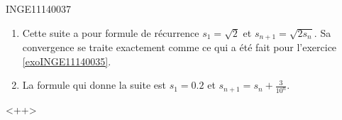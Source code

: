 

\begin{corrige}{INGE11140037}

	\begin{enumerate}

		\item
			Cette suite a pour formule de récurrence $s_1=\sqrt{2}$ et $s_{n+1}=\sqrt{2s_{n}}$. Sa convergence se traite exactement comme ce qui a été fait pour l'exercice \ref{exoINGE11140035}.

		\item
			La formule qui donne la suite est $s_1=0.2$ et $s_{n+1}=s_n+\frac{ 3 }{ 10^n }$.

	\end{enumerate}
	<++>

\end{corrige}
